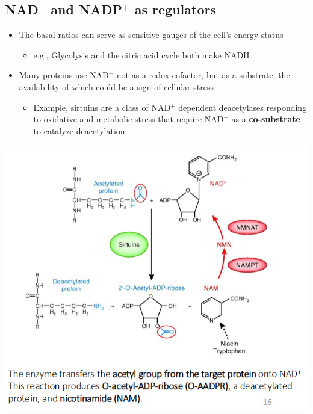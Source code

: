 \documentclass[10pt]{article}
\begin{document}
\subsection*{NAD$^+$ and NADP$^+$ as regulators}
\begin{itemize}
	\item The basal ratios can serve as sensitive gauges of the cell's energy status
	\begin{itemize}
        \item e.g., Glycolysis and the citric acid cycle both make NADH
    \end{itemize}
    \item Many proteins use NAD$^+$ not as a redox cofactor, but as a substrate, the availability of which could be a sign of cellular stress
    \begin{itemize}
        \item Example, sirtuins are a class of NAD$^+$ dependent deacetylases responding to oxidative and metabolic stress that require NAD$^+$ as a \textbf{co-substrate} to catalyze deacetylation
    \end{itemize}
\end{itemize}
\begin{center} 
	\includegraphics*[scale=0.6]{L2_12.png}
\end{center}
\end{document}
